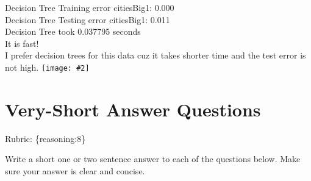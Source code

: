 \documentclass{article}
\def\blu#1{{\color{blu}#1}}
\def\gre#1{{\color{gre}#1}}
\newcommand{\fig}[2]{\texttt{[image: \#2]}}
\def\rubric#1{\gre{Rubric: \{#1\}}}{}
\begin{document}
{{Decision Tree Training error citiesBig1: 0.000\\
Decision Tree Testing error citiesBig1: 0.011\\
Decision Tree took 0.037795 seconds\\
It is fast!\\
I prefer decision trees for this data cuz it takes shorter time and the test error is not high.
}
\fig{0.5}{../figs/q4_2_DT}
}



\section{Very-Short Answer Questions}
\rubric{reasoning:8}

\blu{Write a short one or two sentence answer to each of the questions below}. Make sure your answer is clear and concise.
\end{document}
